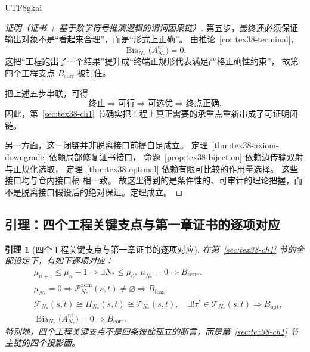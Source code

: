 \documentclass[12pt]{article}
\newtheorem{lemma}{引理}[section]
\newcommand{\Bia}{\operatorname{Bia}}
\begin{document}
\begin{CJK*}{UTF8}{gkai}
\begin{proof}[证明（证书 + 基于数学符号推演逻辑的谓词因果链）]
第五步，最终还必须保证输出对象不是“看起来合理”，而是“形式上正确”。
由推论~\ref{cor:tex38-terminal}，
\[
  \Bia_{N_\ast}\bigl(A_{N_\ast}^{\mathrm{nf}}\bigr)=0.
\]
这把“工程跑出了一个结果”提升成“终端正规形代表满足严格正确性约束”，
故第四个工程支点 $B_{\mathrm{corr}}$ 被钉住。

把上述五步串联，可得
\[
  \text{终止}
  \Longrightarrow
  \text{可行}
  \Longrightarrow
  \text{可选优}
  \Longrightarrow
  \text{终点正确}.
\]
因此，第~\ref{sec:tex38-ch1} 节确实把工程上真正需要的承重点重新串成了可证明闭链。

另一方面，这一闭链并非脱离接口前提自足成立。
定理~\ref{thm:tex38-axiom-downgrade} 依赖局部修复证书接口，
命题~\ref{prop:tex38-bijection} 依赖边传输双射与正规化选取，
定理~\ref{thm:tex38-optimal} 依赖有限可比较的作用量选择。
这些接口均与仓内接口稿
\cite{RepoTex20SemanticGaugeNormalization,RepoTex31RepairTower,RepoTex32ConditionalConvergence,
  RepoTex36HomotopyTwistBijection}
相一致。
故这里得到的是条件性的、可审计的理论把握，而不是脱离接口假设后的绝对保证。定理成立。
\end{proof}

\subsection{引理：四个工程关键支点与第一章证书的逐项对应}
\label{subsec:tex38-engineering-lemma}

\begin{lemma}[四个工程关键支点与第一章证书的逐项对应]
\label{lem:tex38-engineering-bridge}
在第~\ref{sec:tex38-ch1} 节的全部设定下，有如下逐项对应：
\begin{align*}
  &\mu_{n+1}\le\mu_n-1
  \Longrightarrow
  \exists N_\ast\le\mu_0,\ \mu_{N_\ast}=0
  \Longrightarrow
  B_{\mathrm{term}},\\
  &\mu_{N_\ast}=0
  \Longrightarrow
  \mathcal{P}_{N_\ast}^{\mathrm{adm}}(s,t)\neq\varnothing
  \Longrightarrow
  B_{\mathrm{feas}},\\
  &\mathcal{F}_{N_\ast}(s,t)\cong \Pi_{N_\ast}(s,t)\cong \mathcal{T}_{N_\ast}(s,t),
  \quad
  \exists!\tau^\ast\in\mathcal{T}_{N_\ast}(s,t)
  \Longrightarrow
  B_{\mathrm{opt}},\\
  &\Bia_{N_\ast}\bigl(A_{N_\ast}^{\mathrm{nf}}\bigr)=0
  \Longrightarrow
  B_{\mathrm{corr}}.
\end{align*}
特别地，四个工程关键支点不是四条彼此孤立的断言，而是第~\ref{sec:tex38-ch1} 节主链的四个投影面。
\end{lemma}


\end{CJK*}
\end{document}
